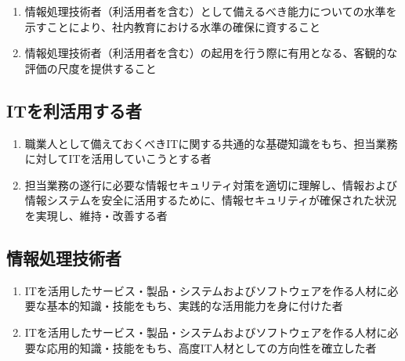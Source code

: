 




\begin{enumerate}[label=\sarrow]
\item {}情報処理技術者（利活用者を含む）として備えるべき能力についての水準を示すことにより、社内教育における水準の確保に資すること
\item 情報処理技術者（利活用者を含む）の起用を行う際に有用となる、客観的な評価の尺度を提供すること
\end{enumerate}




\subsection{ITを利活用する者}
\begin{enumerate}[label*=\Roman*., ref=\Roman*]
\item\label{item:ITseg1}
職業人として備えておくべきITに関する共通的な基礎知識をもち、担当業務に対してITを活用していこうとする者
\item\label{item:ITseg2}
担当業務の遂行に必要な情報セキュリティ対策を適切に理解し、情報および情報システムを安全に活用するために、情報セキュリティが確保された状況を実現し、維持・改善する者
\end{enumerate}

\subsection{情報処理技術者}
\begin{enumerate}[start=3, label*=\Roman*., ref=\Roman*]
\item\label{item:ITseg3}
ITを活用したサービス・製品・システムおよびソフトウェアを作る人材に必要な基本的知識・技能をもち、実践的な活用能力を身に付けた者
\item\label{item:ITseg4}
ITを活用したサービス・製品・システムおよびソフトウェアを作る人材に必要な応用的知識・技能をもち、高度IT人材としての方向性を確立した者
\end{enumerate}



